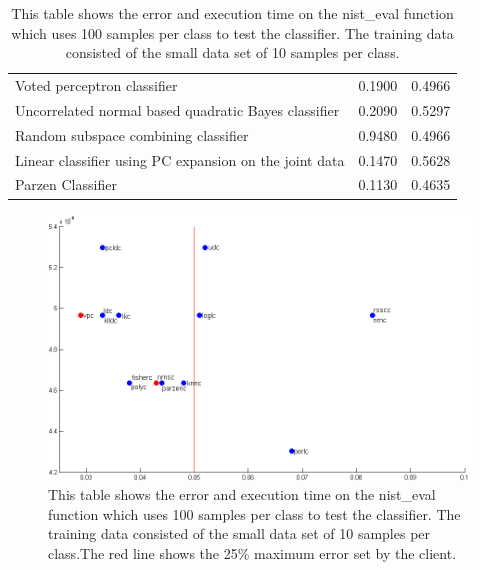 \documentclass[%
        compressed,
        final,
        notitlepage,
        narroweqnarray,
        inline,
        twoside,
        ]{ieee}
\begin{document}
\begin{table}
\begin{tabular} {p{5cm}lp{1.5cm}}
Voted perceptron classifier                                                 & 0.1900 & 0.4966 \\
Uncorrelated normal based quadratic Bayes classifier                        & 0.2090 & 0.5297 \\
Random subspace combining classifier                                        & 0.9480 & 0.4966 \\
Linear classifier using PC expansion on the joint data                      & 0.1470 & 0.5628 \\
Parzen Classifier                                                           & 0.1130 & 0.4635 \\
        \hline
    \end{tabular}
    \caption{
        This table shows the error and execution time on the nist\_eval function
        which uses 100 samples per class to test the classifier. The training
        data consisted of the small data set of 10 samples per class. }
\end{table}

\begin{figure}[] 
    \includegraphics[scale=0.385]{images/large_data_set_tested.png}

    \caption{ This table shows the error and execution time on the nist\_eval
    function which uses 100 samples per class to test the classifier. The
training data consisted of the small data set of 10 samples per class.The
        red line shows the 25\% maximum error set by the client. }
    \label{fig:test-large}
\end{figure}
\end{document}
